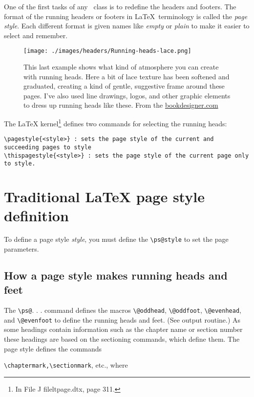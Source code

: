 One of the first tasks of any \LaTeXe\ class is to redefine the headers and footers. The format of the running headers or footers in \LaTeX\ terminology is called the \textit{page style}. Each different format is given names like \textit{empty} or \textit{plain} to make it easier to select and remember. 

\begin{figure}[hbt]
\texttt{[image: ./images/headers/Running-heads-lace.png]}
\caption{This last example shows what kind of atmosphere you can create with running heads. Here a bit of lace texture has been softened and graduated, creating a kind of gentle, suggestive frame around these pages. I’ve also used line drawings, logos, and other graphic elements to dress up running heads like these. From the \protect\href{bookk  }{bookdesigner.com}}
\end{figure}


The LaTeX kernel\footnote{In File J file{ltpage.dtx}, page 311.} defines two commands for selecting the running heads:

\begin{lstlisting}
\pagestyle{<style>} : sets the page style of the current and succeeding pages to style
\thispagestyle{<style>} : sets the page style of the current page only to style.
\end{lstlisting}

\section{Traditional LaTeX page style definition}

To define a page style \textit{style}, you must define the \lstinline{\ps@style} to set the page parameters.

\subsection{How a page style makes running heads and feet}
The \lstinline{\ps@}. . . command defines the macros \lstinline{\@oddhead}, \lstinline{\@oddfoot}, \lstinline{\@evenhead},
and \lstinline{\@evenfoot} to define the running heads and feet. (See output routine.) As some headings contain information such as the chapter name or section number these
headings are based on the sectioning commands, which define them. The page style defines the commands




\verb!\chaptermark,\sectionmark!, etc., where

